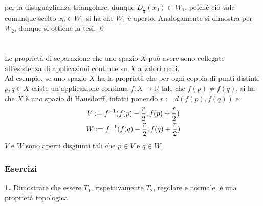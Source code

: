 \documentclass{article}
\begin{document}
per la disuguaglianza triangolare, dunque $D_{\frac{r}{3}}(x_0) \subset W_1$, poiché ciò vale comunque scelto $x_0 \in W_1$ si ha che $W_1$ è aperto. Analogamente si dimostra per $W_2$, dunque si ottiene la tesi. \qed \\ \\ \\
Le proprietà di separazione che uno spazio $X$ può avere sono collegate all'esistenza di applicazioni continue su $X$ a valori reali. \\
Ad esempio, se uno spazio $X$ ha la proprietà che per ogni coppia di punti distinti $p, q \in X$ esiste un'applicazione continua $f : X \longrightarrow \mathbb{R}$ tale che $f(p) \neq f(q)$, si ha che $X$ è uno spazio di Hausdorff, infatti ponendo $r := d(f(p), f(q))$ e
\begin{gather}
    V := f^{-1}(f(p) - \frac{r}{2}, f(p) + \frac{r}{2}) \notag \\
    W := f^{-1}(f(q) - \frac{r}{2}, f(q) + \frac{r}{2}) \notag
\end{gather}
$V$ e $W$ sono aperti disgiunti tali che $p \in V$ e $q \in W$.
\subsubsection{Esercizi}
\textbf{1.} Dimostrare che essere $T_1$, rispettivamente $T_2$, regolare e normale, è una proprietà topologica. \\
\end{document}
